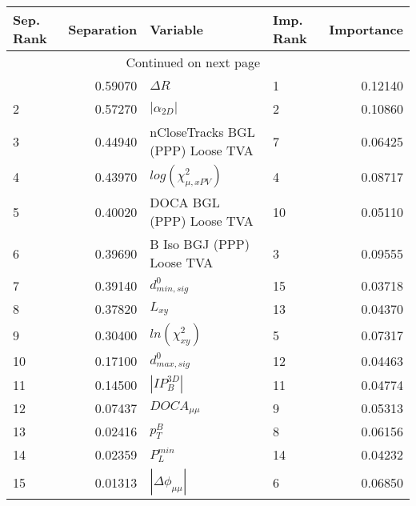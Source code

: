 \usepackage{lscape}

\begin{landscape}
\begin{longtable}{lrllr}
\toprule
Sep. Rank &  Separation &                          Variable & Imp. Rank &  Importance \\
\midrule
\endhead
\midrule
\multicolumn{3}{r}{{Continued on next page}} \\
\midrule
\endfoot

\bottomrule
\endlastfoot
        1 &     0.59070 &                        $\Delta R$ &         1 &     0.12140 \\
        2 &     0.57270 &                   $|\alpha_{2D}|$ &         2 &     0.10860 \\
        3 &     0.44940 &  nCloseTracks BGL (PPP) Loose TVA &         7 &     0.06425 \\
        4 &     0.43970 &         $log(\chi^{2}_{\mu,xPV})$ &         4 &     0.08717 \\
        5 &     0.40020 &          DOCA BGL (PPP) Loose TVA &        10 &     0.05110 \\
        6 &     0.39690 &         B Iso BGJ (PPP) Loose TVA &         3 &     0.09555 \\
        7 &     0.39140 &                  $d^0_{min, sig}$ &        15 &     0.03718 \\
        8 &     0.37820 &                          $L_{xy}$ &        13 &     0.04370 \\
        9 &     0.30400 &               $ln(\chi^{2}_{xy})$ &         5 &     0.07317 \\
       10 &     0.17100 &                  $d^0_{max, sig}$ &        12 &     0.04463 \\
       11 &     0.14500 &                   $|IP_{B}^{3D}|$ &        11 &     0.04774 \\
       12 &     0.07437 &                   $DOCA_{\mu\mu}$ &         9 &     0.05313 \\
       13 &     0.02416 &                         $p^B_{T}$ &         8 &     0.06156 \\
       14 &     0.02359 &                     $P^{min}_{L}$ &        14 &     0.04232 \\
       15 &     0.01313 &          $|\Delta \phi_{\mu\mu}|$ &         6 &     0.06850 \\
\end{longtable}

\end{landscape}
